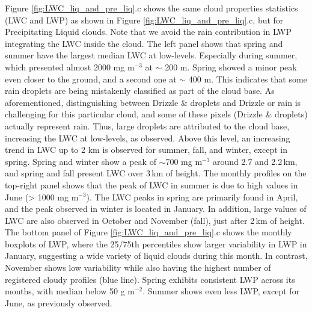 Figure \ref{fig:LWC_liq_and_pre_liq}.c shows the same cloud properties statistics (LWC and LWP) as shown in Figure \ref{fig:LWC_liq_and_pre_liq}.c, but for Precipitating Liquid clouds. Note that we avoid the rain contribution in LWP integrating the LWC inside the cloud.
The left panel shows that spring and summer have the largest median LWC at low-levels. Especially during summer, which presented almost 2000 mg m$^{-3}$ at $\sim$ 200 m. Spring showed a minor peak even closer to the ground, and a second one at $\sim$ 400 m.
This indicates that some rain droplets are being mistakenly classified as part of the cloud base. As aforementioned, distinguishing between Drizzle \& droplets and Drizzle or rain is challenging for this particular cloud, and some of these pixels (Drizzle \& droplets) actually represent rain. Thus, large droplets are attributed to the cloud base, increasing the LWC at low-levels, as observed. Above this level, an increasing trend in LWC up to 2 km is observed for summer, fall, and winter, except in spring. Spring and winter show a peak of $\sim$700 mg m$^{-3}$ around 2.7 and 2.2\,km, and spring and fall present LWC over 3\,km of height. The monthly profiles on the top-right panel shows that the peak of LWC in summer is due to high values in June (> 1000 mg m$^{-3}$). The LWC peaks in spring are primarily found in April, and the peak observed in winter is located in January. In addition, large values of LWC are also observed in October and November (fall), just after 2\,km of height. The bottom panel of Figure \ref{fig:LWC_liq_and_pre_liq}.c shows the monthly boxplots of LWP, where the 25/75th percentiles show larger variability in LWP in January, suggesting a wide variety of liquid clouds during this month. In contrast, November shows low variability while also having the highest number of registered cloudy profiles (blue line).
Spring exhibits consistent LWP across its months, with median below 50 g m$^{-2}$. Summer shows even less LWP, except for June, as previously observed.


